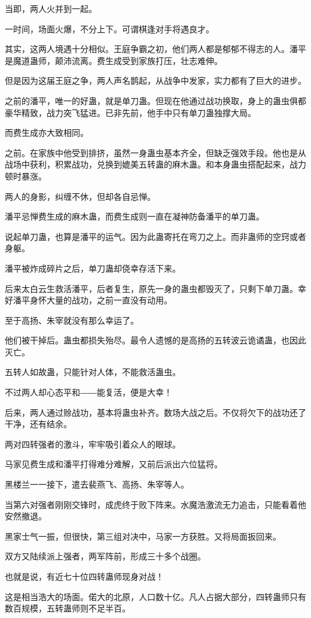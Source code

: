 \begin{this_body}
当即，两人火并到一起。

一时间，场面火爆，不分上下。可谓棋逢对手将遇良才。

其实，这两人境遇十分相似。王庭争霸之初，他们两人都是郁郁不得志的人。潘平是魔道蛊师，颠沛流离。费生成受到家族打压，壮志难伸。

但是因为这届王庭之争，两人声名鹊起，从战争中发家，实力都有了巨大的进步。

之前的潘平，唯一的好蛊，就是单刀蛊。但现在他通过战功换取，身上的蛊虫俱都豪华精致，战力突飞猛进。已非先前，他手中只有单刀蛊独撑大局。

而费生成亦大致相同。

之前。在家族中他受到排挤，虽然一身蛊虫基本齐全，但缺乏强效手段。他也是从战场中获利，积累战功，兑换到媲美五转蛊的麻木蛊。和本身蛊虫搭配起来，战力顿时暴涨。

两人的身影，纠缠不休，但却各自忌惮。

潘平忌惮费生成的麻木蛊，而费生成则一直在凝神防备潘平的单刀蛊。

说起单刀蛊，也算是潘平的运气。因为此蛊寄托在弯刀之上。而非蛊师的空窍或者身躯。

潘平被炸成碎片之后，单刀蛊却侥幸存活下来。

后来太白云生救活潘平，后者复生，原先一身的蛊虫都毁灭了，只剩下单刀蛊。幸好潘平身怀大量的战功，之前一直没有动用。

至于高扬、朱宰就没有那么幸运了。

他们被干掉后。蛊虫都损失殆尽。最令人遗憾的是高扬的五转波云诡谲蛊，也因此灭亡。

五转人如故蛊，只能针对人体，不能救活蛊虫。

不过两人却心态平和――能复活，便是大幸！

后来，两人通过赊战功，基本将蛊虫补齐。数场大战之后。不仅将欠下的战功还了干净，还有结余。

两对四转强者的激斗，牢牢吸引着众人的眼球。

马家见费生成和潘平打得难分难解，又前后派出六位猛将。

黑楼兰一一接下，遣去裴燕飞、高扬、朱宰等人。

当第六对强者刚刚交锋时，成虎终于败下阵来。水魔浩激流无力追击，只能看着他安然撤退。

黑家士气一振，但很快，第三组对决中，马家一方获胜。又将局面扳回来。

双方又陆续派上强者，两军阵前，形成三十多个战圈。

也就是说，有近七十位四转蛊师现身对战！

这是相当浩大的场面。偌大的北原，人口数十亿。凡人占据大部分，四转蛊师只有数百规模，五转蛊师则不足半百。


\end{this_body}

